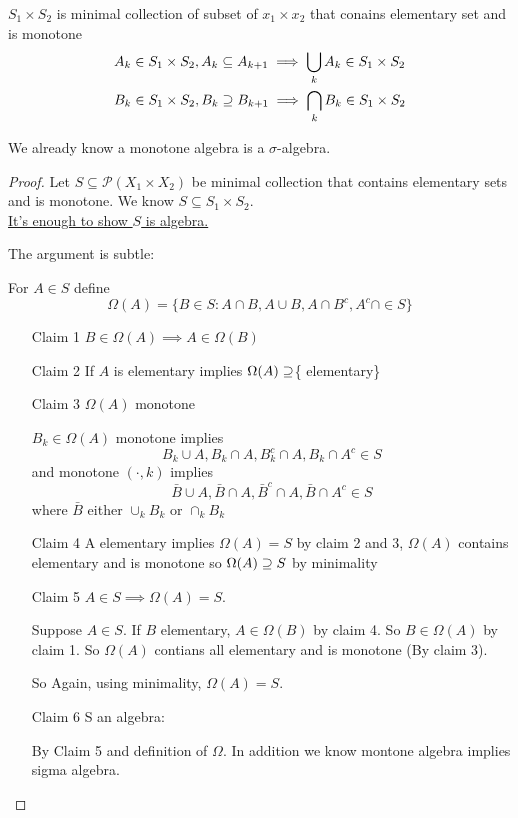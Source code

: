 \begin{lemma}
	$S_1 \times S_2$ is minimal collection of subset of $x_1 \times x_2$ that conains elementary set and is monotone
	\begin{align}
		&A_k \in S_1 \times S_2, A_k \subseteq A_{k+1} \implies \bigcup_{k}A_{k} \in S_1 \times S_2 \\
		&B_k \in S_1 \times S_2, B_k \supseteq B_{k+1} \implies \bigcap_{k}B_{k} \in S_1 \times S_2 \\
	\end{align}
\end{lemma}

\begin{remark}
	We already know a monotone algebra is a $\sigma$-algebra.
\end{remark}

\begin{proof}
	Let $S \subseteq \mathcal{P}(X_1 \times X_2)$ be minimal collection that contains elementary sets and is monotone.
	We know $S \subseteq S_1 \times S_2.$ \\
	\underline{It's enough to show $S$ is algebra.}

	The argument is subtle:

	For $A \in S$ define
	\[
		\Omega (A) = \{ B \in S : A \cap B, A \cup B, A \cap B^c, A^c \cap \in S\}
	\] 
	\begin{enumerate}
		\item[Claim 1] $B \in \Omega (A) \implies A \in \Omega (B)$
		\item[Claim 2]  If $A$ is elementary implies $\Omega (A) \supseteq$\{ elementary\}
		\item[Claim 3] $\Omega (A)$ monotone

			$B_{k} \in \Omega (A) $ monotone implies
			\[
				B_{k} \cup A, B_k \cap A, B_{k}^c \cap A, B_k \cap A^c \in S
			\] and monotone $(\cdot, k)$ implies
			\[
				\bar{B} \cup A, \bar{B} \cap A, \bar{B}^c \cap A, \bar{B} \cap A^c \in S
			\] where $\bar{B}$ either $\cup_{k} B_k$ or $\cap_{k} B_k$

		\item[Claim 4] A elementary implies $\Omega(A) = S$ by claim 2 and 3, $\Omega (A)$ contains elementary and is monotone so $\Omega (A) \supseteq S$ by minimality
		\item[Claim 5] $A \in S \implies \Omega (A) = S$.

			Suppose $A \in S$. If $B$ elementary, $A \in \Omega (B)$ by claim 4. So $B \in \Omega (A)$ by claim 1. So $\Omega (A)$ contians all elementary and is monotone (By claim 3).

			So Again, using minimality, $\Omega (A) = S$.
		\item[Claim 6] S an algebra:

			By Claim 5 and definition of  $\Omega$. In addition we know montone algebra implies sigma algebra.
 	\end{enumerate}
\end{proof}

